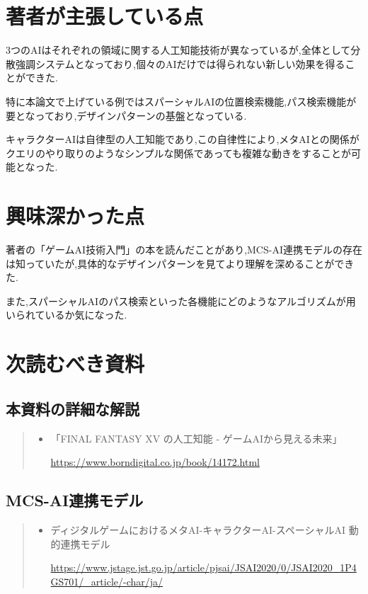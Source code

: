 \documentclass{jarticle}     %
\begin{document}
 \section*{著者が主張している点}
 3つのAIはそれぞれの領域に関する人工知能技術が異なっているが,全体として分散強調システムとなっており,個々のAIだけでは得られない新しい効果を得ることができた.\par
 特に本論文で上げている例ではスパーシャルAIの位置検索機能,パス検索機能が要となっており,デザインパターンの基盤となっている.\par
 キャラクターAIは自律型の人工知能であり,この自律性により,メタAIとの関係がクエリのやり取りのようなシンプルな関係であっても複雑な動きをすることが可能となった.\par

 \section*{興味深かった点}
 著者の「ゲームAI技術入門」の本を読んだことがあり,MCS-AI連携モデルの存在は知っていたが,具体的なデザインパターンを見てより理解を深めることができた.\par
 また,スパーシャルAIのパス検索といった各機能にどのようなアルゴリズムが用いられているか気になった.


 \section*{次読むべき資料}

 \subsection*{本資料の詳細な解説}

 \begin{quote}
  \begin{itemize}
   \item  「FINAL FANTASY XV の人工知能 - ゲームAIから見える未来」\par
   \url{https://www.borndigital.co.jp/book/14172.html}
  \end{itemize}
 \end{quote}

 \subsection*{MCS-AI連携モデル}
 
 \begin{quote}
  \begin{itemize}
   \item  ディジタルゲームにおけるメタAI-キャラクターAI-スペーシャルAI 動的連携モデル\par
   \url{https://www.jstage.jst.go.jp/article/pjsai/JSAI2020/0/JSAI2020_1P4GS701/_article/-char/ja/}
  \end{itemize}
 \end{quote}






\par







\end{document}
